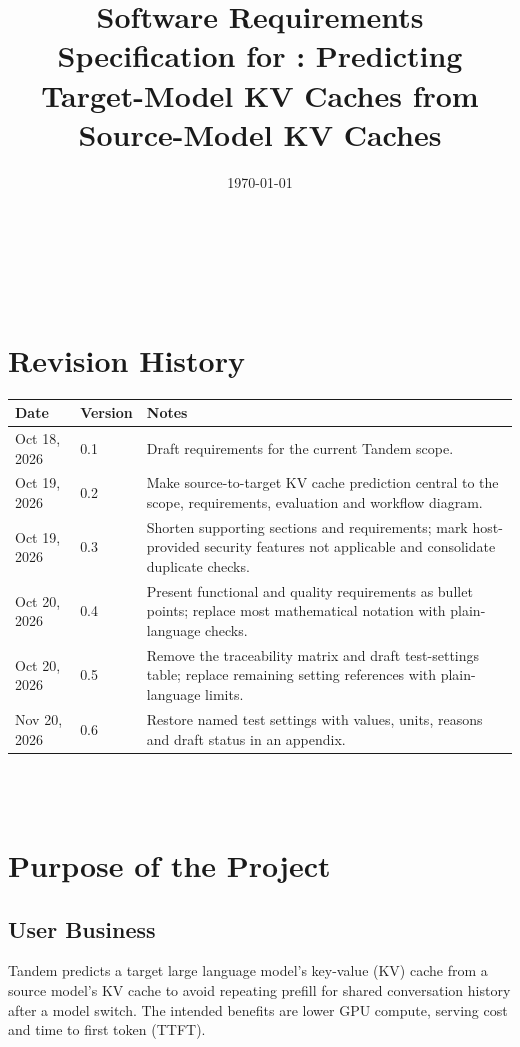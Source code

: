 \documentclass[12pt]{article}
\begin{document}
\title{Software Requirements Specification for \progname: Predicting Target-Model KV Caches from Source-Model KV Caches}
\author{\authname}
\date{\today}
	
\maketitle

~\newpage


\tableofcontents

~\newpage

\section*{Revision History}

\begin{tabularx}{\textwidth}{p{3cm}p{2cm}X}
\toprule {\textbf{Date}} & {\textbf{Version}} & {\textbf{Notes}}\\
\midrule
Oct 18, 2026 & 0.1 & Draft requirements for the current Tandem scope.\\
Oct 19, 2026 & 0.2 & Make source-to-target KV cache prediction central to the scope, requirements, evaluation and workflow diagram.\\
Oct 19, 2026 & 0.3 & Shorten supporting sections and requirements; mark host-provided security features not applicable and consolidate duplicate checks.\\
Oct 20, 2026 & 0.4 & Present functional and quality requirements as bullet points; replace most mathematical notation with plain-language checks.\\
Oct 20, 2026 & 0.5 & Remove the traceability matrix and draft test-settings table; replace remaining setting references with plain-language limits.\\
Nov 20, 2026 & 0.6 & Restore named test settings with values, units, reasons and draft status in an appendix.\\
\bottomrule
\end{tabularx}

~\\

~\newpage
\section{Purpose of the Project}


\subsection{User Business}
Tandem predicts a target large language model's key-value (KV) cache from a
source model's KV cache to avoid repeating prefill for shared conversation
history after a model switch. The intended benefits are lower GPU compute,
serving cost and time to first token (TTFT).
\end{document}
